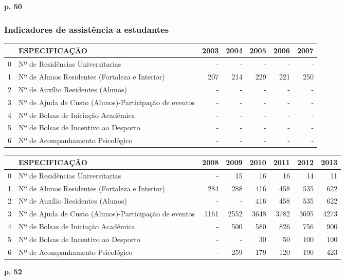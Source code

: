 \documentclass{article}
\begin{document}
\textbf{p. 50}

\subsubsection*{Indicadores de assistência a estudantes}
\begin{tabular}{llrrrrr}
\toprule
{} &                                          ESPECIFICAÇÃO &  2003 &  2004 &  2005 &  2006 &  2007 \\
\midrule
0 &  Nº de Residências Universitarias & - & - & - & - & - \\
1 &  Nº de Alunos Residentes (Fortaleza e Interior) &  207 &  214 &  229 &  221 &  250 \\
2 &  Nº de Auxílio Residentes (Alunos) & - & - & - & - & - \\
3 &  Nº de Ajuda de Custo (Alunos)-Participação de eventos & - & - & - & - & - \\
4 &  Nº de Bolsas de Iniciação Acadêmica & - & - & - & - & - \\
5 &  Nº de Bolsas de Incentivo ao Desporto & - & - & - & - & - \\
6 &  Nº de Acompanhamento Psicológico & - & - & - & - & - \\
\bottomrule
\end{tabular}
\begin{tabular}{llrrrrrr}
\toprule
{} &                                          ESPECIFICAÇÃO &  2008 &  2009 &  2010 &  2011 &  2012 &  2013 \\
\midrule
0 &  Nº de Residências Universitarias & - &  15 &  16 &  16 &  14 &  11 \\
1 &  Nº de Alunos Residentes (Fortaleza e Interior) &  284 &  288 &  416 &  458 &  535 &  622 \\
2 &  Nº de Auxílio Residentes (Alunos) & - & - &  416 &  458 &  535 &  622 \\
3 &  Nº de Ajuda de Custo (Alunos)-Participação de eventos &  1161 &  2552 &  3648 &  3782 &  3695 &  4273 \\
4 &  Nº de Bolsas de Iniciação Acadêmica & - &  500 &  580 &  826 &  756 &  900 \\
5 &  Nº de Bolsas de Incentivo ao Desporto & - & - &  30 &  50 &  100 &  100 \\
6 &  Nº de Acompanhamento Psicológico & - &  259 &  179 &  120 &  190 &  423 \\
\bottomrule
\end{tabular}

\textbf{p. 52}
\end{document}
